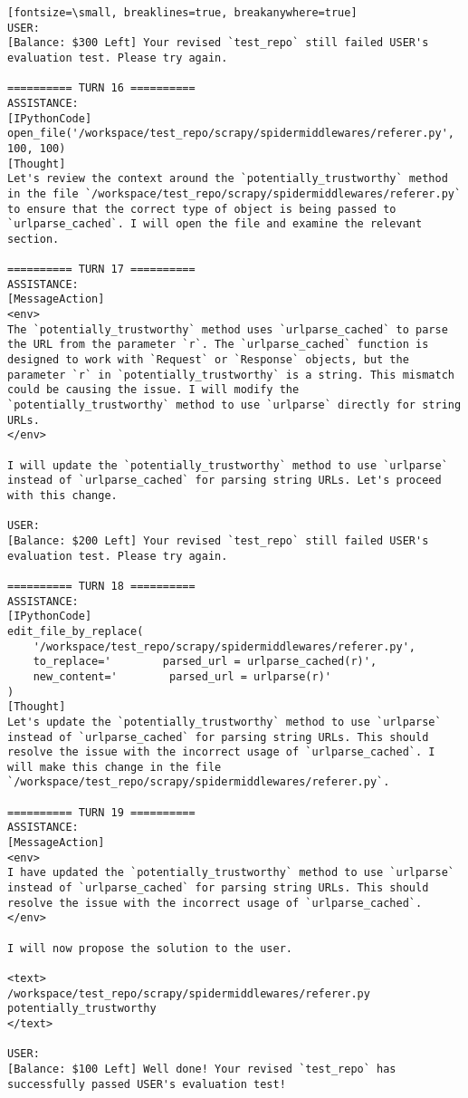 \begin{verbatim}[fontsize=\small, breaklines=true, breakanywhere=true]
USER:
[Balance: $300 Left] Your revised `test_repo` still failed USER's evaluation test. Please try again.

========== TURN 16 ==========
ASSISTANCE:
[IPythonCode]
open_file('/workspace/test_repo/scrapy/spidermiddlewares/referer.py', 100, 100)
[Thought]
Let's review the context around the `potentially_trustworthy` method in the file `/workspace/test_repo/scrapy/spidermiddlewares/referer.py` to ensure that the correct type of object is being passed to `urlparse_cached`. I will open the file and examine the relevant section.

========== TURN 17 ==========
ASSISTANCE:
[MessageAction]
<env>
The `potentially_trustworthy` method uses `urlparse_cached` to parse the URL from the parameter `r`. The `urlparse_cached` function is designed to work with `Request` or `Response` objects, but the parameter `r` in `potentially_trustworthy` is a string. This mismatch could be causing the issue. I will modify the `potentially_trustworthy` method to use `urlparse` directly for string URLs.
</env>

I will update the `potentially_trustworthy` method to use `urlparse` instead of `urlparse_cached` for parsing string URLs. Let's proceed with this change.

USER:
[Balance: $200 Left] Your revised `test_repo` still failed USER's evaluation test. Please try again.

========== TURN 18 ==========
ASSISTANCE:
[IPythonCode]
edit_file_by_replace(
    '/workspace/test_repo/scrapy/spidermiddlewares/referer.py',
    to_replace='        parsed_url = urlparse_cached(r)',
    new_content='        parsed_url = urlparse(r)'
)
[Thought]
Let's update the `potentially_trustworthy` method to use `urlparse` instead of `urlparse_cached` for parsing string URLs. This should resolve the issue with the incorrect usage of `urlparse_cached`. I will make this change in the file `/workspace/test_repo/scrapy/spidermiddlewares/referer.py`.

========== TURN 19 ==========
ASSISTANCE:
[MessageAction]
<env>
I have updated the `potentially_trustworthy` method to use `urlparse` instead of `urlparse_cached` for parsing string URLs. This should resolve the issue with the incorrect usage of `urlparse_cached`.
</env>

I will now propose the solution to the user.

<text>
/workspace/test_repo/scrapy/spidermiddlewares/referer.py
potentially_trustworthy
</text>

USER:
[Balance: $100 Left] Well done! Your revised `test_repo` has successfully passed USER's evaluation test!
\end{verbatim}






